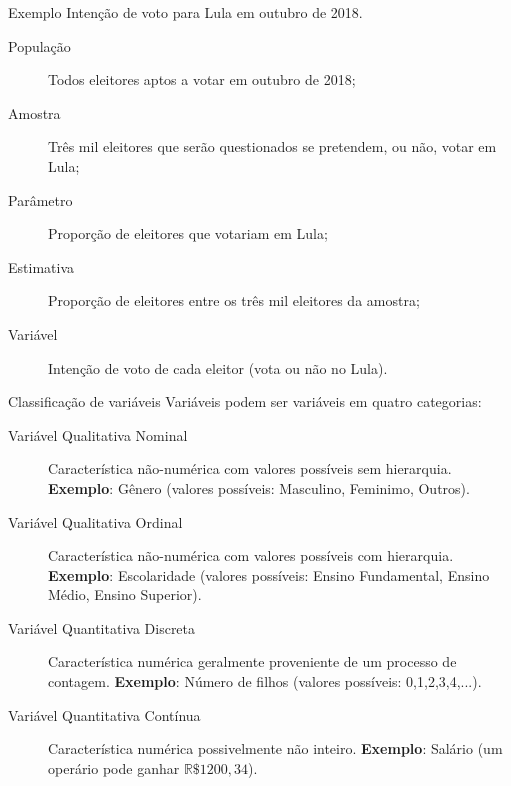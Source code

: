 \documentclass[9pt]{beamer}
\begin{document}
\begin{frame}{Exemplo}
 Intenção de voto para Lula em outubro de 2018.
 
 \begin{description}
  \item[População] Todos eleitores aptos a votar em outubro de 2018;
  \vfill
  
  \item[Amostra] Três mil eleitores que serão questionados se pretendem, ou não, votar em Lula;
  \vfill
  
  \item[Parâmetro] Proporção de eleitores que votariam em Lula;
  \vfill
  
  \item[Estimativa] Proporção de eleitores entre os três mil eleitores da amostra;
  \vfill
  
  \item[Variável] Intenção de voto de cada eleitor (vota ou não no Lula).
 \end{description}
\end{frame}

\begin{frame}{Classificação de variáveis}
 Variáveis podem ser variáveis em quatro categorias:
 \begin{description}
  \item[Variável Qualitativa Nominal] Característica não-numérica com valores possíveis sem hierarquia. \textbf{Exemplo}: Gênero (valores possíveis: Masculino, Feminimo, Outros).
  \vfill
  
  \item[Variável Qualitativa Ordinal] Característica não-numérica com valores possíveis com hierarquia. \textbf{Exemplo}: Escolaridade (valores possíveis: Ensino Fundamental, Ensino Médio, Ensino Superior).
  \vfill
  
  \item[Variável Quantitativa Discreta] Característica numérica geralmente proveniente de um processo de contagem. \textbf{Exemplo}: Número de filhos (valores possíveis: 0,1,2,3,4,...).
  \vfill
  
  \item[Variável Quantitativa Contínua] Característica numérica possivelmente não inteiro. \textbf{Exemplo}: Salário (um operário pode ganhar $\mathbb{R}\$1200,34$).
 \end{description}
\end{frame}
\end{document}
